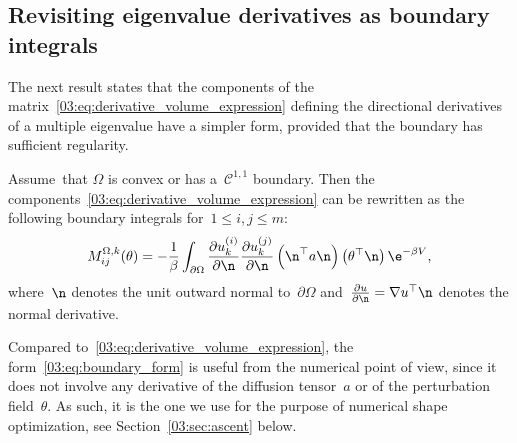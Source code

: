 \subsection{Revisiting eigenvalue derivatives as boundary integrals}
\label{03:subsec:boundary_form}
The next result states that the components of the matrix~\eqref{03:eq:derivative_volume_expression} defining the directional derivatives of a multiple eigenvalue have a simpler form, provided that the boundary has sufficient regularity.
\begin{corollary}
    \label{03:cor:boundary_expression}
    Assume~that $\Omega$ is convex or has a~$\mathcal C^{1,1}$ boundary.
    Then the components~\eqref{03:eq:derivative_volume_expression} can be rewritten as the following boundary integrals for~$1\leq i,j\leq m$:  
    \begin{equation}
        \label{03:eq:boundary_form}
        M^{\Omega,k}_{ij}(\theta) = -\frac1\beta\int_{\partial\Omega} \frac{\partial u_k^{(i)}}{\partial\n}\frac{\partial u_k^{(j)}}{\partial\n}\left(\n^\top a \n\right) \left(\theta^\top\n\right)\e^{-\beta V},
    \end{equation}
    where~$\n$ denotes the unit outward normal to~$\partial\Omega$ and~$\frac{\partial u}{\partial \n} =\nabla u^\top\n$ denotes the normal derivative.
\end{corollary}
Compared to~\eqref{03:eq:derivative_volume_expression}, the form~\eqref{03:eq:boundary_form} is useful from the numerical point of view, since it does not involve any derivative of the diffusion tensor~$a$ or of the perturbation field~$\theta$. As such, it is the one we use for the purpose of numerical shape optimization, see Section~\ref{03:sec:ascent} below.

